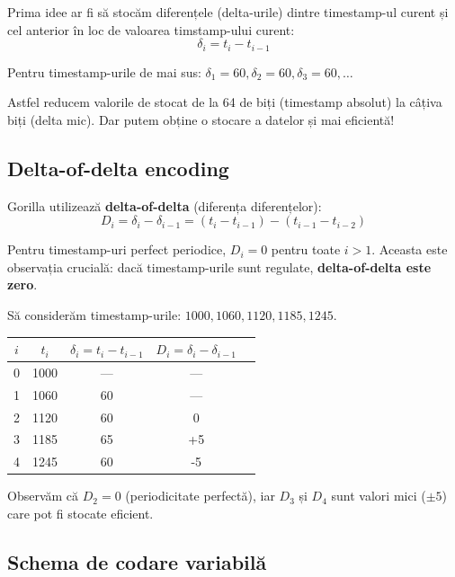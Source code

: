 Prima idee ar fi să stocăm diferențele (delta-urile) dintre timestamp-ul curent și cel anterior în loc de valoarea timstamp-ului curent:
\begin{equation}
    \delta_i = t_i - t_{i-1}
\end{equation}

Pentru timestamp-urile de mai sus: $\delta_1 = 60, \delta_2 = 60, \delta_3 = 60, \ldots$

Astfel reducem valorile de stocat de la 64 de biți (timestamp absolut) la câțiva biți (delta mic). Dar putem obține o stocare a datelor și mai eficientă!

\subsection{Delta-of-delta encoding}

Gorilla utilizează \textbf{delta-of-delta} (diferența diferențelor):
\begin{equation}
    D_i = \delta_i - \delta_{i-1} = (t_i - t_{i-1}) - (t_{i-1} - t_{i-2})
\end{equation}

Pentru timestamp-uri perfect periodice, $D_i = 0$ pentru toate $i > 1$. Aceasta este observația crucială: dacă timestamp-urile sunt regulate, \textbf{delta-of-delta este zero}.

\begin{example}
Să considerăm timestamp-urile: $1000, 1060, 1120, 1185, 1245$.

\begin{center}
\begin{tabular}{ccccc}
\toprule
$i$ & $t_i$ & $\delta_i = t_i - t_{i-1}$ & $D_i = \delta_i - \delta_{i-1}$ \\
\midrule
0 & 1000 & --- & --- \\
1 & 1060 & 60 & --- \\
2 & 1120 & 60 & 0 \\
3 & 1185 & 65 & +5 \\
4 & 1245 & 60 & -5 \\
\bottomrule
\end{tabular}
\end{center}

Observăm că $D_2 = 0$ (periodicitate perfectă), iar $D_3$ și $D_4$ sunt valori mici ($\pm 5$) care pot fi stocate eficient.
\end{example}

\subsection{Schema de codare variabilă}

